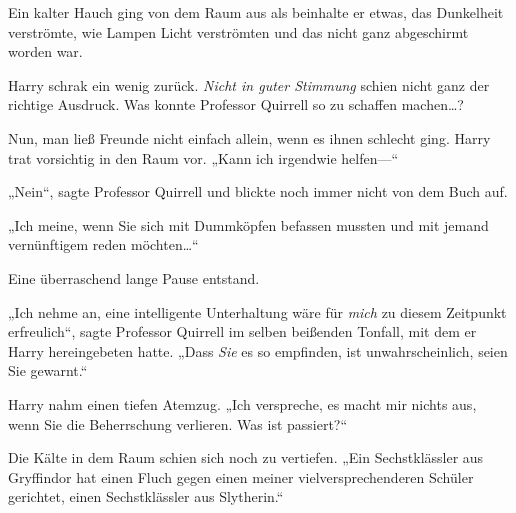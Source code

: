 Ein kalter Hauch ging von dem Raum aus als beinhalte er etwas, das Dunkelheit verströmte, wie Lampen Licht verströmten und das nicht ganz abgeschirmt worden war.

Harry schrak ein wenig zurück. \emph{Nicht in guter Stimmung} schien nicht ganz der richtige Ausdruck. Was konnte Professor Quirrell so zu schaffen machen…?

Nun, man ließ Freunde nicht einfach allein, wenn es ihnen schlecht ging. Harry trat vorsichtig in den Raum vor. „Kann ich irgendwie helfen—“

„Nein“, sagte Professor Quirrell und blickte noch immer nicht von dem Buch auf.


„Ich meine, wenn Sie sich mit Dummköpfen befassen mussten und mit jemand vernünftigem reden möchten…“

Eine überraschend lange Pause entstand.

„Ich nehme an, eine intelligente Unterhaltung wäre für \emph{mich} zu diesem Zeitpunkt erfreulich“, sagte Professor Quirrell im selben beißenden Tonfall, mit dem er Harry hereingebeten hatte. „Dass \emph{Sie} es so empfinden, ist unwahrscheinlich, seien Sie gewarnt.“

Harry nahm einen tiefen Atemzug. „Ich verspreche, es macht mir nichts aus, wenn Sie die Beherrschung verlieren. Was ist passiert?“

Die Kälte in dem Raum schien sich noch zu vertiefen. „Ein Sechstklässler aus Gryffindor hat einen Fluch gegen einen meiner vielversprechenderen Schüler gerichtet, einen Sechstklässler aus Slytherin.“

